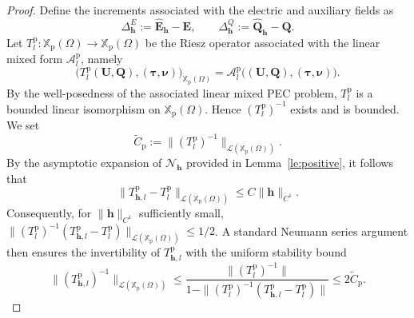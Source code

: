\documentclass[12pt,reqno]{amsart}
\theoremstyle{definition}
\numberwithin{equation}{section}
\begin{document}
\begin{proof}

Define the increments associated with the electric and auxiliary fields as
\[
\Delta_{\mathbf{h}}^E := \hat{\mathbf{E}}_{\mathbf{h}} - \mathbf{E}, \qquad \Delta_{\mathbf{h}}^Q := \hat{\mathbf{Q}}_{\mathbf{h}} - \mathbf{Q}.
\]
Let
$
T_l^{\mathrm p}:\mathbb X_{\mathrm p}(\Omega)\to
\mathbb X_{\mathrm p}(\Omega)$
be the Riesz operator associated with the linear mixed form
\(\mathcal A_l^{\mathrm p}\), namely
\[
\bigl(
T_l^{\mathrm p}(\mathbf U,\mathbf Q),
(\boldsymbol\tau,\boldsymbol\nu)
\bigr)_{\mathbb X_{\mathrm p}(\Omega)}
=
\mathcal A_l^{\mathrm p}
\bigl(
(\mathbf U,\mathbf Q),
(\boldsymbol\tau,\boldsymbol\nu)
\bigr).
\]
By the well-posedness of the associated linear mixed PEC problem,
\(T_l^{\mathrm p}\) is a bounded linear isomorphism on
\(\mathbb X_{\mathrm p}(\Omega)\). Hence
\((T_l^{\mathrm p})^{-1}\) exists and is bounded. We set
\[
\widetilde C_{\mathrm p}
:=
\bigl\|(T_l^{\mathrm p})^{-1}\bigr\|_
{\mathcal L(\mathbb X_{\mathrm p}(\Omega))}.
\]By the asymptotic expansion of $\mathcal{N}_{\mathbf{h}}$ provided in Lemma~\ref{le:positive}, it follows that
\[
\|T_{\mathbf{h},l}^{\mathrm{p}} - T_l^{\mathrm{p}}\|_{\mathcal{L}(\mathbb{X}_{\mathrm{p}}(\Omega))} \le C \|\mathbf{h}\|_{C^1}.
\]
Consequently, for $\|\mathbf{h}\|_{C^1}$ sufficiently small, $\|(T_l^{\mathrm{p}})^{-1} (T_{\mathbf{h},l}^{\mathrm{p}} - T_l^{\mathrm{p}})\|_{\mathcal{L}(\mathbb{X}_{\mathrm{p}}(\Omega))} \le 1/2$. A standard Neumann series argument then ensures the invertibility of $T_{\mathbf{h},l}^{\mathrm{p}}$ with the uniform stability bound
\[
\|(T_{\mathbf{h},l}^{\mathrm{p}})^{-1}\|_{\mathcal{L}(\mathbb{X}_{\mathrm{p}}(\Omega))} \le \frac{\|(T_l^{\mathrm{p}})^{-1}\|}{1 - \|(T_l^{\mathrm{p}})^{-1}(T_{\mathbf{h},l}^{\mathrm{p}} - T_l^{\mathrm{p}})\|} \le 2\widetilde{C}_{\mathrm{p}}.
\]


\end{proof}
\end{document}
